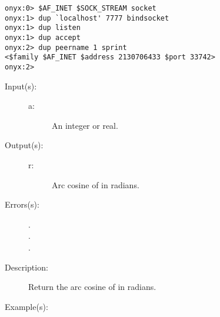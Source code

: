 \begin{description}
\begin{description}
\begin{verbatim}
onyx:0> $AF_INET $SOCK_STREAM socket
onyx:1> dup `localhost' 7777 bindsocket
onyx:1> dup listen
onyx:1> dup accept
onyx:2> dup peername 1 sprint
<$family $AF_INET $address 2130706433 $port 33742>
onyx:2>
		\end{verbatim}
	\end{description}
\label{systemdict:acos}
\item[{\onyxop{a}{acos}{r}}: ]
	\begin{description}\item[]
	\item[Input(s): ]
		\begin{description}\item[]
		\item[a: ]
			An integer or real.
		\end{description}
	\item[Output(s): ]
		\begin{description}\item[]
		\item[r: ]
			Arc cosine of  in radians.
		\end{description}
	\item[Errors(s): ]
		\begin{description}\item[]
		\item[.]
		\item[.]
		\item[.]
		\end{description}
	\item[Description: ]
		Return the arc cosine of  in radians.
	\item[Example(s): ]\begin{verbatim}


\end{verbatim}
\end{description}
\end{description}
